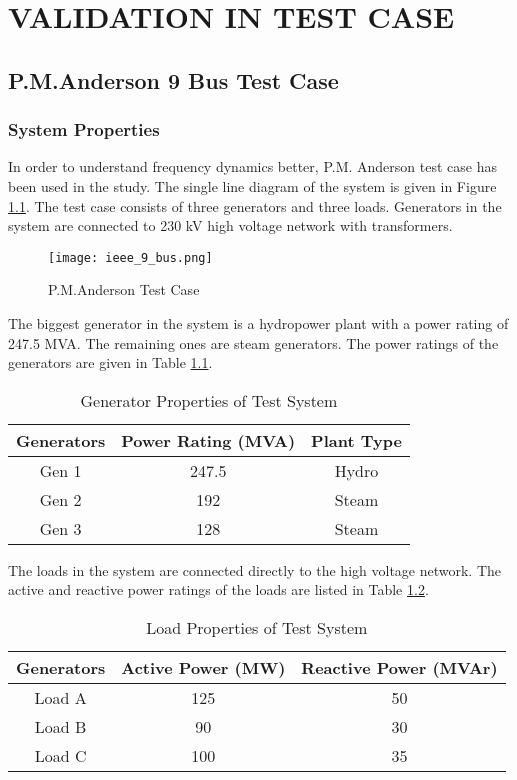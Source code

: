 \chapter{VALIDATION IN TEST CASE}
\label{chp:4}
\section{P.M.Anderson 9 Bus Test Case}
\subsection{System Properties}
In order to understand frequency dynamics better, P.M. Anderson test case has been used in the study. The single line diagram of the system is given in Figure \ref{ieee_9_bus}. The test case consists of three generators and three loads. Generators in the system are connected to 230 kV high voltage network with transformers.\par
\begin{figure}[h!]
	\centering
	\texttt{[image: ieee\_9\_bus.png]}
	\caption{P.M.Anderson Test Case}
	\label{ieee_9_bus}
\end{figure}
The biggest generator in the system is a hydropower plant with a power rating of 247.5 MVA. The remaining ones are steam generators. The power ratings of the generators are given in Table \ref{generatorproperties}.\par
\begin{table}[h!]
	\centering
	\begin{tabular}{ccc}
		\hline
		\textbf{Generators} & \textbf{Power Rating (MVA)} & \textbf{Plant Type} \\ \hline
		Gen 1               & 247.5                       & Hydro				\\
		Gen 2               & 192                         & Steam               \\
		Gen 3               & 128                         & Steam               \\ \hline
	\end{tabular}
	\caption{Generator Properties of Test System}
	\label{generatorproperties}
\end{table}
The loads in the system are connected directly to the high voltage network. The active and reactive power ratings of the loads are listed in Table \ref{loadproperties}.
\begin{table}[h!]
	\centering
	\begin{tabular}{ccc}
		\hline
		\textbf{Generators} & \textbf{Active Power (MW)}  & \textbf{Reactive Power (MVAr)} \\ \hline
		Load A              & 125                      	  & 50				 \\
		Load B              & 90                          & 30                \\
		Load C              & 100                         & 35                \\ \hline
	\end{tabular}
	\caption{Load Properties of Test System}
	\label{loadproperties}
\end{table}
